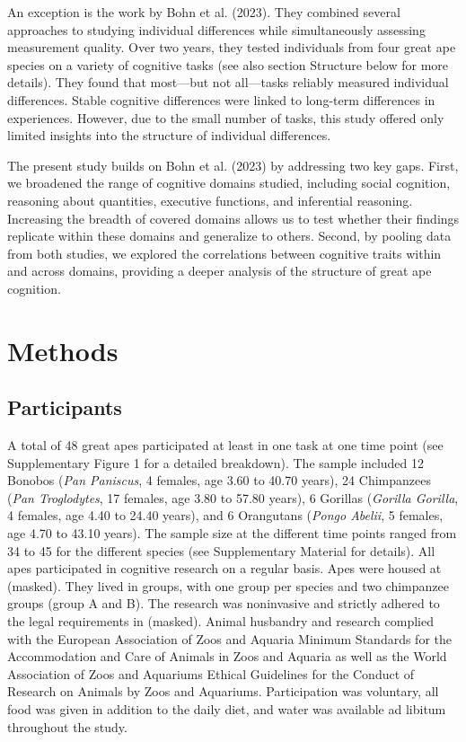 \documentclass[
  man,floatsintext]{apa6}
\begin{document}
An exception is the work by Bohn et al. (2023). They combined several approaches to studying individual differences while simultaneously assessing measurement quality. Over two years, they tested individuals from four great ape species on a variety of cognitive tasks (see also section Structure below for more details). They found that most---but not all---tasks reliably measured individual differences. Stable cognitive differences were linked to long-term differences in experiences. However, due to the small number of tasks, this study offered only limited insights into the structure of individual differences.

The present study builds on Bohn et al. (2023) by addressing two key gaps. First, we broadened the range of cognitive domains studied, including social cognition, reasoning about quantities, executive functions, and inferential reasoning. Increasing the breadth of covered domains allows us to test whether their findings replicate within these domains and generalize to others. Second, by pooling data from both studies, we explored the correlations between cognitive traits within and across domains, providing a deeper analysis of the structure of great ape cognition.

\section{Methods}\label{methods}

\subsection{Participants}\label{participants}

A total of 48 great apes participated at least in one task at one time point (see Supplementary Figure 1 for a detailed breakdown). The sample included 12 Bonobos (\emph{Pan Paniscus}, 4 females, age 3.60 to 40.70 years), 24 Chimpanzees (\emph{Pan Troglodytes}, 17 females, age 3.80 to 57.80 years), 6 Gorillas (\emph{Gorilla Gorilla}, 4 females, age 4.40 to 24.40 years), and 6 Orangutans (\emph{Pongo Abelii}, 5 females, age 4.70 to 43.10 years). The sample size at the different time points ranged from 34 to 45 for the different species (see Supplementary Material for details). All apes participated in cognitive research on a regular basis. Apes were housed at (masked). They lived in groups, with one group per species and two chimpanzee groups (group A and B). The research was noninvasive and strictly adhered to the legal requirements in (masked). Animal husbandry and research complied with the European Association of Zoos and Aquaria Minimum Standards for the Accommodation and Care of Animals in Zoos and Aquaria as well as the World Association of Zoos and Aquariums Ethical Guidelines for the Conduct of Research on Animals by Zoos and Aquariums. Participation was voluntary, all food was given in addition to the daily diet, and water was available ad libitum throughout the study.
\end{document}
